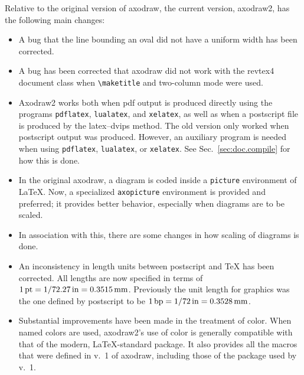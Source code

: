 \documentclass[12pt]{article}
\def\program#1{\texttt{#1}}
\begin{document}
Relative to the original version of axodraw, the current version,
axodraw2, has the following main changes:
\begin{itemize}

\item A bug that the line bounding an oval did not have a uniform
  width has been corrected.

\item A bug has been corrected that axodraw did not work with the
  revtex4 document class when \verb+\maketitle+ and two-column mode
  were used.

\item Axodraw2 works both when pdf output is produced directly using
  the programs \program{pdflatex}, \program{lualatex}, and
  \program{xelatex}, as well as when a postscript file is produced by
  the latex--dvips method.  The old version only worked when
  postscript output was produced.  However, an auxiliary program is
  needed when using \program{pdflatex}, \program{lualatex}, or
  \program{xelatex}.  See Sec.\ \ref{sec:doc.compile} for how this is
  done.

\item In the original axodraw, a diagram is coded inside a
  \verb+picture+ environment of \LaTeX.  Now, a specialized
  \verb+axopicture+ environment is provided and preferred; it provides
  better behavior, especially when diagrams are to be scaled.

\item In association with this, there are some changes in how scaling
  of diagrams is done.

\item An inconsistency in length units between postscript and \TeX{}
  has been corrected.  All lengths are now specified in terms of
  $\unit[1]{pt} = \unit[1/72.27]{in} = \unit[0.3515]{mm}$.  Previously
  the unit length for graphics was the one defined by postscript to be 
  $\unit[1]{bp} = \unit[1/72]{in} = \unit[0.3528]{mm}$.

\item Substantial improvements have been made in the treatment of
  color.  When named colors are used, axodraw2's use of color is
  generally compatible with that of the modern, \LaTeX-standard
   package.  It also provides all the macros that were
  defined in v.\ 1 of axodraw, including those of the 
  package used by v.\ 1.


\end{itemize}
\end{document}
